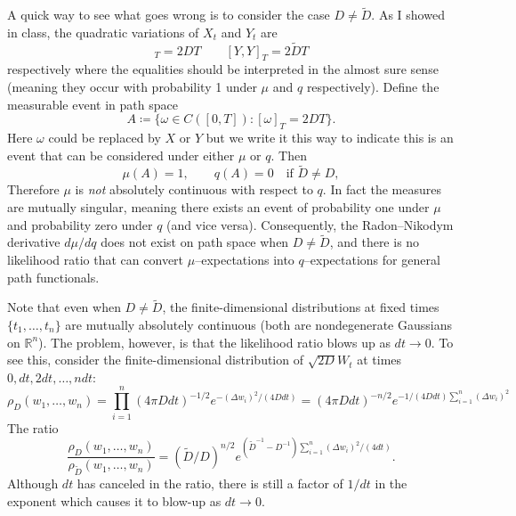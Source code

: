 \documentclass[11pt]{article}
\begin{document}
A quick way to see what goes wrong is to consider the case $D\neq \tilde D$. 
As I showed in class, the quadratic variations of $X_t$ and $Y_t$ are 
\begin{equation}
[X,X]_T = 2DT
\qquad
[Y,Y]_T = 2\tilde D T
\end{equation}
respectively where the equalities should be interpreted in the almost sure sense (meaning they occur with probability 1 under $\mu$ and $q$ respectively). 
Define the measurable event in path space
\begin{equation}
A \coloneqq \{\omega\in C([0,T]) : [\omega]_T = 2DT\}.
\end{equation}
Here $\omega$ could be replaced by $X$ or $Y$ but we write it this way to indicate this is an event that can be considered under either $\mu$ or $q$. 
Then
\begin{equation}
\mu(A)=1,
\qquad
q(A)=0 \quad \text{if } \tilde D\neq D,
\end{equation}
Therefore $\mu$ is \emph{not} absolutely continuous with respect to $q$. In fact the measures are mutually singular,
meaning there exists an event of probability one under $\mu$ and probability zero under $q$ (and vice versa). Consequently, the Radon--Nikodym derivative $d\mu/dq$ does not exist on path space when $D\neq \tilde D$, and there is no likelihood ratio that can convert $\mu$--expectations into $q$--expectations for general path functionals.


Note that even when $D\neq \tilde D$, the finite-dimensional distributions at fixed times $\{t_1,\dots,t_n\}$ are mutually absolutely continuous (both are nondegenerate Gaussians on ${\mathbb R}^n$). The problem, however, is that the likelihood ratio blows up as $dt \to 0$. 
To see this, consider the finite-dimensional distribution of $\sqrt{2D}W_t$ at times $0,dt,2dt,\dots,ndt$: 
\begin{equation}
\rho_D(w_1,\dots,w_n) = \prod_{i=1}^n (4 \pi D dt)^{-1/2}e^{-(\Delta w_i)^2/(4D dt)} = (4 \pi D dt)^{-n/2}e^{-1/(4D dt) \sum_{i=1}^n(\Delta w_i)^2} 
\end{equation}
The ratio
\begin{equation}
\frac{\rho_D(w_1,\dots,w_n)}{\rho_{\tilde{D}}(w_1,\dots,w_n)} = \left(\tilde{D}/D \right)^{n/2} e^{(\tilde{D}^{-1}-D^{-1})\sum_{i=1}^n(\Delta w_i)^2/(4 dt)}.
\end{equation}
Although $dt$ has canceled in the ratio, there is still a factor of $1/dt$ in the exponent which causes it to blow-up as $dt \to 0$. 
 
 
\end{document}

